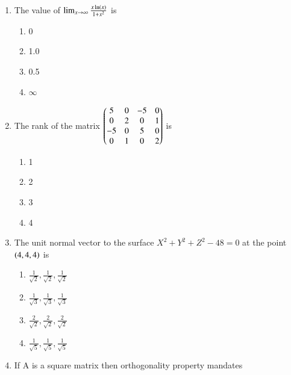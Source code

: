 \documentclass[journal,12pt,onecolumn]{article}
\theoremstyle{remark}
\begin{document}
\begin{enumerate}
\item The value of $\lim_{x \to \infty} \frac{x \ln\left(x\right)}{1+x^2}$ is

\hfill{}

\begin{multicols}{2}
\begin{enumerate}
    \item 0
    \item 1.0
    \item 0.5
    \item $\infty$
\end{enumerate}
\end{multicols}

\item The rank of the matrix $\begin{pmatrix}5 & 0 & -5 & 0 \\ 0 & 2 & 0 & 1 \\ -5 & 0 & 5 & 0 \\ 0 & 1 & 0 & 2\end{pmatrix}$ is

\hfill{}

\begin{multicols}{2}
\begin{enumerate}
    \item 1
    \item 2
    \item 3
    \item 4
\end{enumerate}
\end{multicols}

\item The unit normal vector to the surface $X^2+Y^2+Z^2-48=0$ at the point $\left(4, 4, 4\right)$ is

\hfill{}

\begin{enumerate}
    \item $\frac{1}{\sqrt{2}}, \frac{1}{\sqrt{2}}, \frac{1}{\sqrt{2}}$
    \item $\frac{1}{\sqrt{3}}, \frac{1}{\sqrt{3}}, \frac{1}{\sqrt{3}}$
    \item $\frac{2}{\sqrt{2}}, \frac{2}{\sqrt{2}}, \frac{2}{\sqrt{2}}$
    \item $\frac{1}{\sqrt{5}}, \frac{1}{\sqrt{5}}, \frac{1}{\sqrt{5}}$
\end{enumerate}

\item If A is a square matrix then orthogonality property mandates


\end{enumerate}
\end{document}
